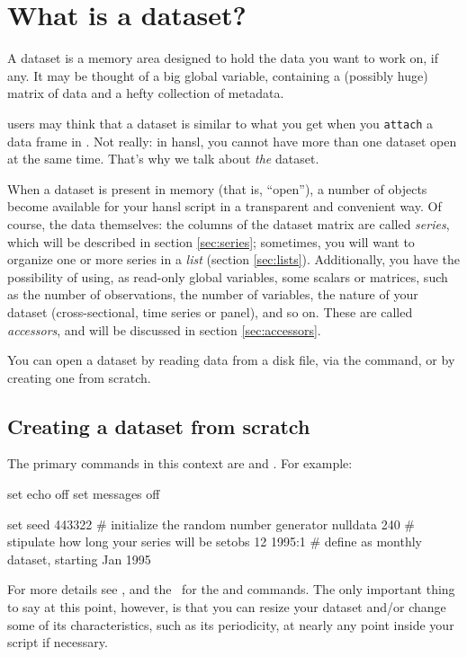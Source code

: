 \chapter{What is a dataset?}
\label{chap:dataset}

A dataset is a memory area designed to hold the data you want to work
on, if any. It may be thought of a big global variable, containing a
(possibly huge) matrix of data and a hefty collection of metadata.

 users may think that a dataset is similar to what you get when
you \texttt{attach} a data frame in . Not really: in hansl, you
cannot have more than one dataset open at the same time. That's why we
talk about \emph{the} dataset.

When a dataset is present in memory (that is, ``open''), a number of
objects become available for your hansl script in a transparent and
convenient way. Of course, the data themselves: the columns of the
dataset matrix are called \emph{series}, which will be described in
section \ref{sec:series}; sometimes, you will want to organize one or
more series in a \emph{list} (section \ref{sec:lists}). Additionally,
you have the possibility of using, as read-only global variables, some
scalars or matrices, such as the number of observations, the number of
variables, the nature of your dataset (cross-sectional, time series or
panel), and so on. These are called \emph{accessors}, and will be
discussed in section \ref{sec:accessors}.

You can open a dataset by reading data from a disk file, via the
 command, or by creating one from scratch.

\section{Creating a dataset from scratch}

The primary commands in this context are  and
.  For example:
\begin{code}
set echo off
set messages off

set seed 443322           # initialize the random number generator
nulldata 240              # stipulate how long your series will be
setobs 12 1995:1          # define as monthly dataset, starting Jan 1995   
\end{code}

For more details see \GUG, and the \GCR\ for the  and
 commands. The only important thing to say at this point,
however, is that you can resize your dataset and/or change some of its
characteristics, such as its periodicity, at nearly any point inside
your script if necessary.

